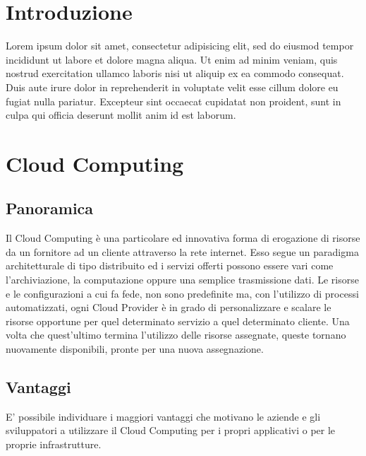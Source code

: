 
\section{Introduzione}
Lorem ipsum dolor sit amet, consectetur adipisicing elit, sed do eiusmod
tempor incididunt ut labore et dolore magna aliqua. Ut enim ad minim veniam,
quis nostrud exercitation ullamco laboris nisi ut aliquip ex ea commodo
consequat. Duis aute irure dolor in reprehenderit in voluptate velit esse
cillum dolore eu fugiat nulla pariatur. Excepteur sint occaecat cupidatat non
proident, sunt in culpa qui officia deserunt mollit anim id est laborum.

\section{Cloud Computing}
\subsection{Panoramica}
Il Cloud Computing è una particolare ed innovativa forma di erogazione di risorse da un fornitore ad un cliente attraverso la rete internet. Esso segue un paradigma architetturale di tipo distribuito ed i servizi offerti possono essere vari come l'archiviazione, la computazione oppure una semplice trasmissione dati.
Le risorse e le configurazioni a cui fa fede, non sono predefinite ma, con l'utilizzo di processi automatizzati, ogni
 Cloud Provider è in grado di personalizzare e scalare le risorse opportune per quel determinato servizio a quel determinato cliente. Una volta che quest'ultimo termina l'utilizzo delle risorse assegnate, queste tornano nuovamente disponibili, pronte per una nuova assegnazione.

\subsection{Vantaggi}
E' possibile individuare i maggiori vantaggi che motivano le aziende e gli sviluppatori a utilizzare il Cloud Computing per i propri applicativi o per le proprie infrastrutture.

